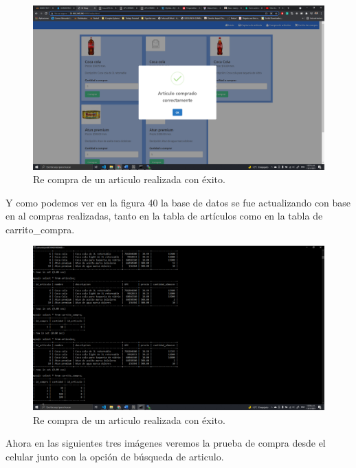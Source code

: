 \documentclass[11pt]{article}
\begin{document}
		\begin{figure}[H]
			\centering
			\includegraphics[scale=0.34]{resources/p3.7_recompra.png}
			\caption{Re compra de un articulo realizada con éxito.}\label{fig:picture}
		\end{figure}
		Y como podemos ver en la figura 40 la base de datos se fue actualizando con base en al compras realizadas, tanto en la tabla de artículos como en la tabla de carrito\_compra.
		\begin{figure}[H]
			\centering
			\includegraphics[scale=0.34]{resources/bdp3.png}
			\caption{Re compra de un articulo realizada con éxito.}\label{fig:picture}
		\end{figure}
		Ahora en las siguientes tres imágenes veremos la prueba de compra desde el celular junto con la opción de búsqueda de articulo.
\end{document}
